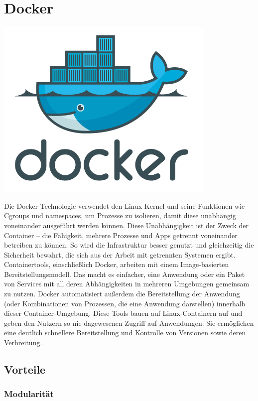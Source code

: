 \section{Docker}
\includegraphics[scale=0.05]{pics/logos/dockerLogo.png}

Die Docker-Technologie verwendet den Linux Kernel und seine Funktionen wie Cgroups und namespaces, um Prozesse zu isolieren, damit diese unabhängig voneinander ausgeführt werden können. 
Diese Unabhängigkeit ist der Zweck der Container – die Fähigkeit, mehrere Prozesse und Apps getrennt voneinander betreiben zu können. 
So wird die Infrastruktur besser genutzt und gleichzeitig die Sicherheit bewahrt, die sich aus der Arbeit mit getrennten Systemen ergibt.
Containertools, einschließlich Docker, arbeiten mit einem Image-basierten Bereitstellungsmodell. Das macht es einfacher, eine Anwendung oder ein Paket von Services mit all deren 
Abhängigkeiten in mehreren Umgebungen gemeinsam zu nutzen. Docker automatisiert außerdem die Bereitstellung der Anwendung 
(oder Kombinationen von Prozessen, die eine Anwendung darstellen) innerhalb dieser Container-Umgebung. Diese Tools bauen auf Linux-Containern auf 
und geben den Nutzern so nie dagewesenen Zugriff auf Anwendungen. Sie ermöglichen eine deutlich schnellere Bereitstellung und Kontrolle von Versionen sowie deren Verbreitung.
\cite{sysarch-docker-1}

\subsection{Vorteile}

\subsubsection{Modularität}

